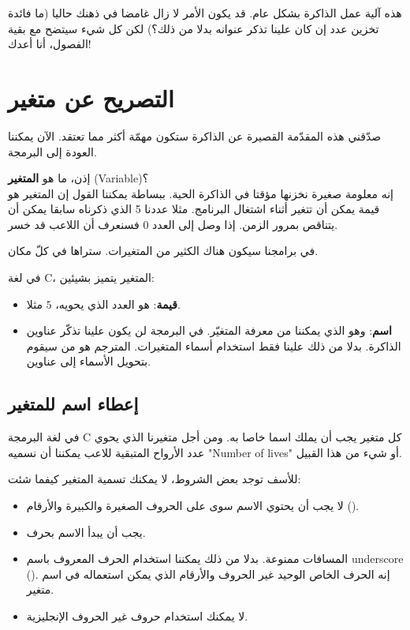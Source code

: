 هذه آلية عمل الذاكرة بشكل عام. قد يكون الأمر لا زال غامضا في ذهنك حاليا (ما فائدة تخزين عدد إن كان علينا تذكر عنوانه بدلا من ذلك؟) لكن كل شيء سيتضح مع بقية الفصول، أنا أعدك!

\section{التصريح عن متغير}

صدّقني هذه المقدّمة القصيرة عن الذاكرة ستكون مهمّة أكثر مما تعتقد. الآن يمكننا العودة إلى البرمجة.

إذن، ما هو
\textbf{المتغير}
(\textenglish{Variable})؟\\
إنه معلومة صغيرة نخزنها مؤقتا في الذاكرة الحية. ببساطة يمكننا القول إن المتغير هو قيمة يمكن أن تتغير أثناء اشتغال البرنامج. مثلا عددنا 5 الذي ذكرناه سابقا يمكن أن يتناقص بمرور الزمن. إذا وصل إلى العدد 0 فسنعرف أن اللاعب قد خسر.

في برامجنا سيكون هناك الكثير من المتغيرات. ستراها في كلّ مكان.

في لغة \textenglish{C}،
 المتغير يتميز بشيئين:

\begin{itemize}
  \item \textbf{قيمة}:
   هو العدد الذي يحويه، $ 5 $ مثلا.
  \item \textbf{اسم}:
   وهو الذي يمكننا من معرفة المتغيّر. في البرمجة لن يكون علينا تذكّر عناوين الذاكرة. بدلا من ذلك علينا فقط استخدام أسماء المتغيرات. المترجم هو من سيقوم بتحويل الأسماء إلى عناوين.
\end{itemize}

\subsection{إعطاء اسم للمتغير}

في لغة البرمجة
\textenglish{C}
كل متغير يجب أن يملك اسما خاصا به. ومن أجل متغيرنا الذي يحوي عدد الأرواح المتبقية للاعب يمكننا أن نسميه
"\textenglish{Number of lives}"
أو شيء من هذا القبيل.

للأسف توجد بعض الشروط، لا يمكنك تسمية المتغير كيفما شئت:

\begin{itemize}
  \item لا يجب أن يحتوي الاسم سوى على الحروف الصغيرة والكبيرة والأرقام
().
  \item يجب أن يبدأ الاسم بحرف.
  \item المسافات ممنوعة. بدلا من ذلك يمكننا استخدام الحرف المعروف باسم
\textenglish{underscore}
 (\InlineCode{\_}).
إنه الحرف الخاص الوحيد غير الحروف والأرقام الذي يمكن استعماله في اسم متغير.
  \item لا يمكنك استخدام حروف غير الحروف الإنجليزية.
\end{itemize}

